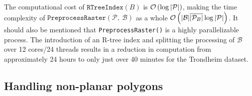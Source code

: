 The computational cost of $\texttt{RTreeIndex}(B)$ is $\mathcal{O}\left(\log{|\mathcal{P}|}\right)$, making the time complexity of $\texttt{PreprocessRaster}(\mathcal{P},~\mathcal{B})$ as a whole $\mathcal{O}\left(|\mathcal{B}| \overline{|\mathcal{P}_B|} \log{|\mathcal{P}|}\right)$.
It should also be mentioned that \texttt{PreprocessRaster()} is a highly parallelizable process.
The introduction of an R-tree index and splitting the processing of $\mathcal{B}$ over 12 cores/24 threads results in a reduction in computation from approximately 24 hours to only just over 40 minutes for the Trondheim dataset.

\subsection{Handling non-planar polygons}%
\label{sec:non-planar-fix}


